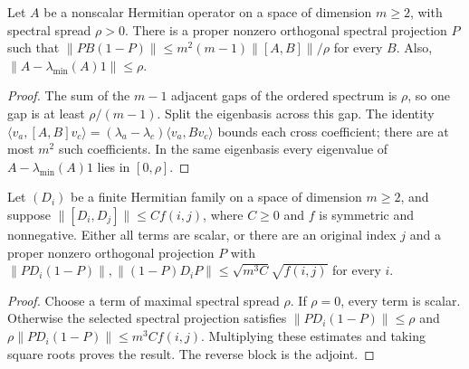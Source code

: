 \begin{lemma}
    \label{thm:hastings05_spectral_split}
    \leanok
    Let $A$ be a nonscalar Hermitian operator on a space of dimension
    $m\ge2$, with spectral spread $\rho>0$. There is a proper nonzero
    orthogonal spectral projection $P$ such that
    $\|PB(1-P)\|\le m^2(m-1)\|[A,B]\|/\rho$ for every $B$.
    Also, $\|A-\lambda_{\min}(A)1\|\le\rho$.
\end{lemma}
\begin{proof}\leanok
    The sum of the $m-1$ adjacent gaps of the ordered spectrum is $\rho$,
    so one gap is at least $\rho/(m-1)$. Split the eigenbasis across this
    gap. The identity
    $\langle v_a,[A,B]v_c\rangle=(\lambda_a-\lambda_c)\langle v_a,Bv_c\rangle$
    bounds each cross coefficient; there are at most $m^2$ such coefficients.
    In the same eigenbasis every eigenvalue of
    $A-\lambda_{\min}(A)1$ lies in $[0,\rho]$.
\end{proof}

\begin{lemma}
    \label{thm:hastings05_uniform_family_split}
    \leanok
    Let $(D_i)$ be a finite Hermitian family on a space of dimension
    $m\ge2$, and suppose $\|[D_i,D_j]\|\le C f(i,j)$, where $C\ge0$
    and $f$ is symmetric and nonnegative. Either all terms are scalar,
    or there are an original index $j$ and a proper nonzero orthogonal
    projection $P$ with
    $\|PD_i(1-P)\|,\|(1-P)D_iP\|\le\sqrt{m^3C}\sqrt{f(i,j)}$ for every $i$.
\end{lemma}
\begin{proof}\leanok
    Choose a term of maximal spectral spread $\rho$. If $\rho=0$, every
    term is scalar. Otherwise the selected spectral projection satisfies
    $\|PD_i(1-P)\|\le\rho$ and
    $\rho\|PD_i(1-P)\|\le m^3Cf(i,j)$. Multiplying these estimates and
    taking square roots proves the result. The reverse block is the adjoint.
\end{proof}

